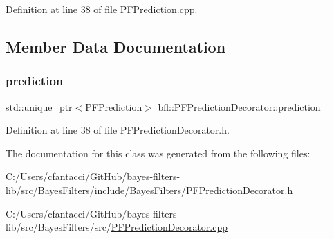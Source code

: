 Definition at line 38 of file P\+F\+Prediction.\+cpp.



\subsection{Member Data Documentation}
\mbox{\label{classbfl_1_1PFPredictionDecorator_a95f122f6fb7e69c436ae221c40d1c515}} 
\subsubsection{\texorpdfstring{prediction\+\_\+}{prediction\_}}
{\footnotesize\ttfamily std\+::unique\+\_\+ptr$<$\mbox{\hyperlink{classbfl_1_1PFPrediction}{P\+F\+Prediction}}$>$ bfl\+::\+P\+F\+Prediction\+Decorator\+::prediction\+\_\+\hspace{0.3cm}{\ttfamily [private]}}



Definition at line 38 of file P\+F\+Prediction\+Decorator.\+h.



The documentation for this class was generated from the following files\+:\begin{DoxyCompactItemize}
\item 
C\+:/\+Users/cfantacci/\+Git\+Hub/bayes-\/filters-\/lib/src/\+Bayes\+Filters/include/\+Bayes\+Filters/\mbox{\hyperlink{PFPredictionDecorator_8h}{P\+F\+Prediction\+Decorator.\+h}}\item 
C\+:/\+Users/cfantacci/\+Git\+Hub/bayes-\/filters-\/lib/src/\+Bayes\+Filters/src/\mbox{\hyperlink{PFPredictionDecorator_8cpp}{P\+F\+Prediction\+Decorator.\+cpp}}\end{DoxyCompactItemize}
